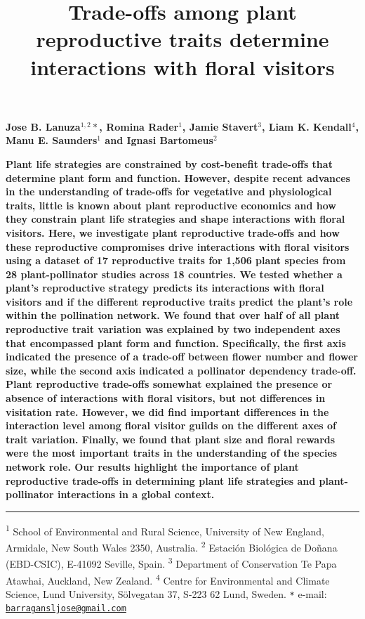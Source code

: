\documentclass[12pt,a4paper,]{article}
\title{\singlespacing \vspace{-1.5cm} \LARGE Trade-offs among plant
reproductive traits determine interactions with floral visitors}
\author{}
\date{\vspace{-2.5em}}
\begin{document}
\maketitle

\vspace{-2.2cm} \singlespacing
\large 
\textbf{Jose B. Lanuza$^{1,2}*$, Romina Rader$^{1}$, Jamie Stavert$^{3}$, Liam K. Kendall$^{4}$, Manu E. Saunders$^{1}$ and Ignasi Bartomeus$^{2}$}

\normalsize

\textbf{Plant life strategies are constrained by cost-benefit trade-offs
that determine plant form and function. However, despite recent advances
in the understanding of trade-offs for vegetative and physiological
traits, little is known about plant reproductive economics and how they
constrain plant life strategies and shape interactions with floral
visitors. Here, we investigate plant reproductive trade-offs and how
these reproductive compromises drive interactions with floral visitors
using a dataset of 17 reproductive traits for 1,506 plant species from
28 plant-pollinator studies across 18 countries. We tested whether a
plant's reproductive strategy predicts its interactions with floral
visitors and if the different reproductive traits predict the plant's
role within the pollination network. We found that over half of all
plant reproductive trait variation was explained by two independent axes
that encompassed plant form and function. Specifically, the first axis
indicated the presence of a trade-off between flower number and flower
size, while the second axis indicated a pollinator dependency trade-off.
Plant reproductive trade-offs somewhat explained the presence or absence
of interactions with floral visitors, but not differences in visitation
rate. However, we did find important differences in the interaction
level among floral visitor guilds on the different axes of trait
variation. Finally, we found that plant size and floral rewards were the
most important traits in the understanding of the species network role.
Our results highlight the importance of plant reproductive trade-offs in
determining plant life strategies and plant-pollinator interactions in a
global context.}

\small
\vspace{-0.5cm}

\noindent\rule{\textwidth}{1pt}

\textsuperscript{1} School of Environmental and Rural Science,
University of New England, Armidale, New South Wales 2350, Australia.
\textsuperscript{2} Estación Biológica de Doñana (EBD-CSIC), E-41092
Seville, Spain. \textsuperscript{3} Department of Conservation
\textbar{} Te Papa Atawhai, Auckland, New Zealand. \textsuperscript{4}
Centre for Environmental and Climate Science, Lund University,
Sölvegatan 37, S-223 62 Lund, Sweden. \texttt{*} e-mail:
\href{mailto:barragansljose@gmail.com}{\nolinkurl{barragansljose@gmail.com}}
\end{document}
